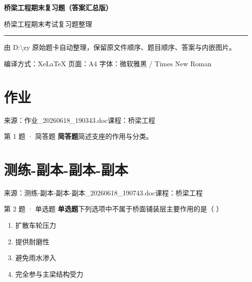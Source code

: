 \documentclass[UTF8,zihao=-4,openany]{ctexbook}
\newenvironment{choices}{\begin{enumerate}[label=\Alph*.,leftmargin=9mm,labelsep=3mm,itemsep=2pt,topsep=4pt]}{\end{enumerate}}
\newcommand{\qtype}[1]{\textcolor{brand}{\sffamily\bfseries #1}}
\newcommand{\sourcefile}[1]{\textcolor{muted}{\small\sffamily 来源：#1}}
\begin{document}
\frontmatter
\begin{titlepage}
\pagecolor{paper}
\vspace*{22mm}
{\sffamily\bfseries\fontsize{30}{36}\selectfont\color{branddark} 桥梁工程期末复习题（答案汇总版）\par}
\vspace{5mm}
{\Large\color{ink} 桥梁工程期末考试复习题整理\par}
\vspace{10mm}
{\color{brand}\rule{0.62\linewidth}{1.2pt}\par}
\vspace{9mm}
{\large\color{muted} 由 D:\textbackslash zy 原始题卡自动整理，保留原文件顺序、题目顺序、答案与内嵌图片。\par}
\vfill
{\sffamily\color{muted} 编译方式：XeLaTeX \quad 页面：A4 \quad 字体：微软雅黑 / Times New Roman\par}
\end{titlepage}
\nopagecolor
\tableofcontents
\mainmatter


\chapter{作业}

\sourcefile{作业\_20260618\_190343.doc}\quad \textcolor{muted}{\small\sffamily 课程：桥梁工程}

\begin{questionbox}{第 1 题 · 简答题}
\qtype{简答题}\quad 简述支座的作用与分类。
\end{questionbox}

\chapter{测练-副本-副本-副本}

\sourcefile{测练-副本-副本-副本\_20260618\_190743.doc}\quad \textcolor{muted}{\small\sffamily 课程：桥梁工程}

\begin{questionbox}{第 2 题 · 单选题}
\qtype{单选题}\quad 下列选项中不属于桥面铺装层主要作用的是（ ）
\begin{choices}
\item 扩散车轮压力
\item 提供耐磨性
\item 避免雨水渗入
\item 完全参与主梁结构受力
\end{choices}
\end{questionbox}
\end{document}

